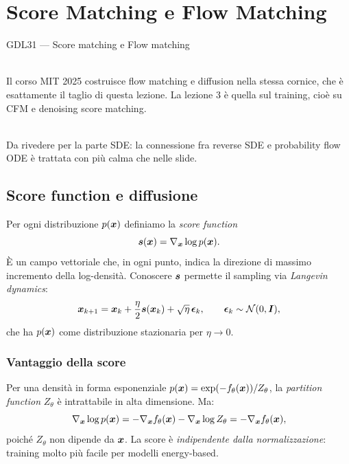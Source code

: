 \chapter{Score Matching e Flow Matching}
\label{ch:flowmatching}

\begin{risorsevideo}{GDL31 — Score matching e Flow matching}

\medskip
{}\\
Il corso MIT 2025 costruisce flow matching e diffusion nella stessa cornice, che è esattamente il taglio di questa lezione. La lezione 3 è quella sul training, cioè su CFM e denoising score matching.

\medskip
{}\\
Da rivedere per la parte SDE: la connessione fra reverse SDE e probability flow ODE è trattata con più calma che nelle slide.
\end{risorsevideo}

\section{Score function e diffusione}

Per ogni distribuzione $p(\bm{x})$ definiamo la \emph{score function}
\[
\bm{s}(\bm{x}) = \nabla_{\bm{x}} \log p(\bm{x}).
\]
È un campo vettoriale che, in ogni punto, indica la direzione di massimo incremento della log-densità. Conoscere $\bm{s}$ permette il sampling via \emph{Langevin dynamics}:
\begin{equation}
\bm{x}_{k+1} = \bm{x}_k + \frac{\eta}{2}\bm{s}(\bm{x}_k) + \sqrt{\eta}\,\boldsymbol{\epsilon}_k, \qquad \boldsymbol{\epsilon}_k \sim \mathcal{N}(0,\bm{I}),
\end{equation}
che ha $p(\bm{x})$ come distribuzione stazionaria per $\eta \to 0$.

\subsection{Vantaggio della score}

Per una densità in forma esponenziale $p(\bm{x}) = \exp(-f_\theta(\bm{x}))/Z_\theta$, la \emph{partition function} $Z_\theta$ è intrattabile in alta dimensione. Ma:
\[
\nabla_{\bm{x}} \log p(\bm{x}) = -\nabla_{\bm{x}} f_\theta(\bm{x}) - \nabla_{\bm{x}} \log Z_\theta = -\nabla_{\bm{x}} f_\theta(\bm{x}),
\]
poiché $Z_\theta$ non dipende da $\bm{x}$. La score è \emph{indipendente dalla normalizzazione}: training molto più facile per modelli energy-based.

